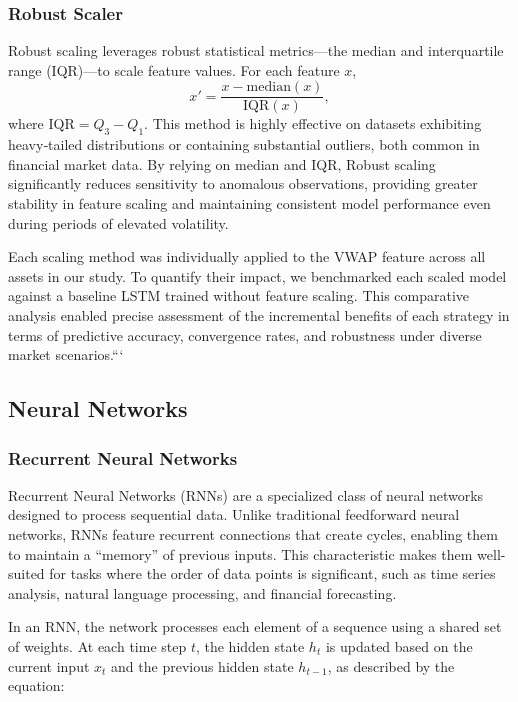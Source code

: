 \documentclass[letterpaper]{article}
\begin{document}
\subsubsection{Robust Scaler}
Robust scaling leverages robust statistical metrics—the median and interquartile range (IQR)—to scale feature values. For each feature \(x\),  
\[
x' = \frac{x - \mathrm{median}(x)}{\mathrm{IQR}(x)},
\]
where \(\mathrm{IQR} = Q_{3} - Q_{1}\). This method is highly effective on datasets exhibiting heavy‑tailed distributions or containing substantial outliers, both common in financial market data. By relying on median and IQR, Robust scaling significantly reduces sensitivity to anomalous observations, providing greater stability in feature scaling and maintaining consistent model performance even during periods of elevated volatility.

Each scaling method was individually applied to the VWAP feature across all assets in our study. To quantify their impact, we benchmarked each scaled model against a baseline LSTM trained without feature scaling. This comparative analysis enabled precise assessment of the incremental benefits of each strategy in terms of predictive accuracy, convergence rates, and robustness under diverse market scenarios.```

\subsection{Neural Networks}

\subsubsection{Recurrent Neural Networks}

Recurrent Neural Networks (RNNs) are a specialized class of neural networks designed to process sequential data. Unlike traditional feedforward neural networks, RNNs feature recurrent connections that create cycles, enabling them to maintain a ``memory'' of previous inputs. This characteristic makes them well-suited for tasks where the order of data points is significant, such as time series analysis, natural language processing, and financial forecasting.

In an RNN, the network processes each element of a sequence using a shared set of weights. At each time step \( t \), the hidden state \( h_t \) is updated based on the current input \( x_t \) and the previous hidden state \( h_{t-1} \), as described by the equation:
\end{document}
